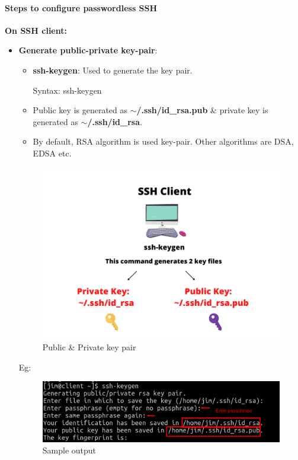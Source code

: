 \begin{flushleft}
\begin{itemize}
\end{itemize}

\newpage
\paragraph{Steps to configure passwordless SSH}

\textbf{On SSH client:}
\begin{itemize}
	\item \textbf{Generate public-private key-pair}:
	\begin{itemize}
		\item \textbf{ssh-keygen}: Used to generate the key pair.
		\begin{tcolorbox}[breakable,notitle,boxrule=0pt,colback=pink,colframe=pink]
			\color{black}
			\font=9pt
			Syntax: ssh-keygen
			\font=4pt
		\end{tcolorbox}
		
		\item Public key is generated as \textbf{$\sim$/.ssh/id\_rsa.pub} \& private key is generated as \textbf{$\sim$/.ssh/id\_rsa}.
		\item By default, RSA algorithm is used key-pair. Other algorithms are DSA, EDSA etc.
	\end{itemize}

	\begin{figure}[h!]
		\centering
		\includegraphics[scale=0.4]{content/chapter19/images/ssh0.png}
		\caption{Public \& Private key pair}
		\label{fig:stage5563}
	\end{figure}
	
	Eg:
	\begin{figure}[h!]
		\centering
		\includegraphics[scale=0.2]{content/chapter19/images/ssh9.png}
		\caption{Sample output}
		\label{fig:stage7}
	\end{figure}
	

\end{itemize}
\end{flushleft}

